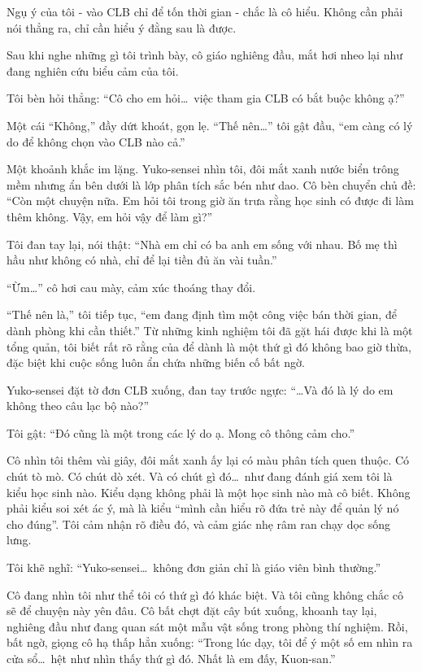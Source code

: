 \documentclass[../main.tex]{subfiles}
\begin{document}
Ngụ ý của tôi - vào CLB chỉ để tốn thời gian - chắc là cô hiểu. Không cần phải nói thẳng ra, chỉ cần hiểu ý đằng sau là được.

Sau khi nghe những gì tôi trình bày, cô giáo nghiêng đầu, mắt hơi nheo lại như đang nghiên cứu biểu cảm của tôi.

Tôi bèn hỏi thẳng: ``Cô cho em hỏi\dots\ việc tham gia CLB có bắt buộc không ạ?''

Một cái ``Không,'' đầy dứt khoát, gọn lẹ.  ``Thế nên\dots'' tôi gật đầu, ``em càng có lý do để không chọn vào CLB nào cả.''

Một khoảnh khắc im lặng. Yuko-sensei nhìn tôi, đôi mắt xanh nước biển trông mềm nhưng ẩn bên dưới là lớp phân tích sắc bén như dao. Cô bèn chuyển chủ đề: ``Còn một chuyện nữa. Em hỏi tôi trong giờ ăn trưa rằng học sinh có được đi làm thêm không. Vậy, em hỏi vậy để làm gì?''

Tôi đan tay lại, nói thật: ``Nhà em chỉ có ba anh em sống với nhau. Bố mẹ thì hầu như không có nhà, chỉ để lại tiền đủ ăn vài tuần.''

``Ừm\dots'' cô hơi cau mày, cảm xúc thoáng thay đổi.

``Thế nên là,'' tôi tiếp tục, ``em đang định tìm một công việc bán thời gian, để dành phòng khi cần thiết.'' Từ những kinh nghiệm tôi đã gặt hái được khi là một tổng quản, tôi biết rất rõ rằng của để dành là một thứ gì đó không bao giờ thừa, đặc biệt khi cuộc sống luôn ẩn chứa những biến cố bất ngờ.

Yuko-sensei đặt tờ đơn CLB xuống, đan tay trước ngực: ``\dots Và đó là lý do em không theo câu lạc bộ nào?''

Tôi gật: ``Đó cũng là một trong các lý do ạ. Mong cô thông cảm cho.''

Cô nhìn tôi thêm vài giây, đôi mắt xanh ấy lại có màu phân tích quen thuộc. Có chút tò mò. Có chút dò xét. Và có chút gì đó\dots\ như đang đánh giá xem tôi là kiểu học sinh nào. Kiểu dạng không phải là một học sinh nào mà cô biết. Không phải kiểu soi xét ác ý, mà là kiểu ``mình cần hiểu rõ đứa trẻ này để quản lý nó cho đúng''. Tôi cảm nhận rõ điều đó, và cảm giác nhẹ râm ran chạy dọc sống lưng.

Tôi khẽ nghĩ: ``Yuko-sensei\dots\ không đơn giản chỉ là giáo viên bình thường.''

Cô đang nhìn tôi như thể tôi có thứ gì đó khác biệt. Và tôi cũng không chắc cô sẽ để chuyện này yên đâu. Cô bất chợt đặt cây bút xuống, khoanh tay lại, nghiêng đầu như đang quan sát một mẫu vật sống trong phòng thí nghiệm. Rồi, bất ngờ, giọng cô hạ thấp hẳn xuống: ``Trong lúc dạy, tôi để ý một số em nhìn ra cửa sổ\dots\ hệt như nhìn thấy thứ gì đó. Nhất là em đấy, Kuon-san.''
\end{document}
